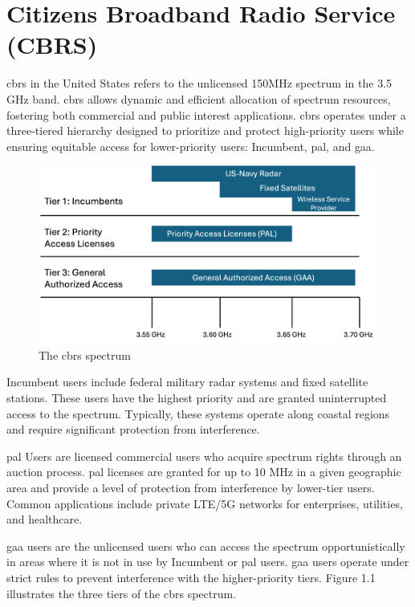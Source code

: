 \section{Citizens Broadband Radio Service (CBRS)}
\label{sec:sec-1-1}

\gls{cbrs} in the United States refers to the unlicensed 150MHz spectrum in the 3.5 GHz band. \gls{cbrs} allows dynamic and efficient allocation of spectrum resources, fostering both commercial and public interest applications. \gls{cbrs} operates under a three-tiered hierarchy designed to prioritize and protect high-priority users while ensuring equitable access for lower-priority users:
 Incumbent, \gls{pal}, and \gls{gaa}. 

\begin{figure}[ht]
\includegraphics[width=\textwidth]{figures/cbrs_1.png}
\centering
\caption{The \gls{cbrs} spectrum }
\label{fig:cbrs-spectrum}
\centering
\end{figure}


Incumbent users include federal military radar systems and fixed satellite stations. These users have the highest priority and are granted uninterrupted access to the spectrum. Typically, these systems operate along coastal regions and require significant protection from interference.

\gls{pal} Users are licensed commercial users who acquire spectrum rights through an auction process. \gls{pal} licenses are granted for up to 10 MHz in a given geographic area and provide a level of protection from interference by lower-tier users. Common applications include private LTE/5G networks for enterprises, utilities, and healthcare.

\gls{gaa} users are the unlicensed users who can access the spectrum opportunistically in areas where it is not in use by Incumbent or \gls{pal} users.
\gls{gaa} users operate under strict rules to prevent interference with the higher-priority tiers. Figure 1.1 illustrates the three tiers of the \gls{cbrs} spectrum.

